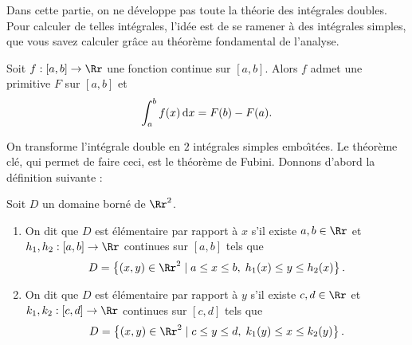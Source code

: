 \documentclass[class=report,crop=false]{standalone}
\begin{document}
\thispagestyle{empty}

\vskip4mm

\noindent Dans cette partie, on ne développe pas toute la théorie des intégrales doubles. Pour calculer de telles intégrales, l'idée est de se ramener à des intégrales simples, que vous savez calculer gr\^ace au théorème fondamental de l'analyse. 

\vskip6mm

\begin{theoreme}Soit $f:[a,b]\to \Rr$ une fonction continue sur $[a,b]$. Alors $f$ admet une primitive $F$ sur $[a,b]$ et
$$\int_{a}^{b}f(x)\,\mathrm{d} x=F(b)-F(a).$$
\end{theoreme}

\vskip4mm

\noindent On transforme l'intégrale double en $2$ intégrales simples embo\^{\i}tées. Le théorème clé, qui permet de faire ceci, est le théorème de Fubini. Donnons d'abord la définition suivante :

\vskip6mm

\begin{definition}Soit $D$ un domaine borné de $\Rr^2$.
\begin{enumerate}
\item On dit que $D$ est élémentaire par rapport à $x$ s'il existe $a,b\in \Rr$ et $h_1,h_2:[a,b]\to \Rr$ continues sur $[a,b]$ tels que
$$D=\left\{(x,y)\in \Rr^2\mid a\leq x\leq b,\; h_1(x)\leq y\leq h_2 (x)\right\}.$$
\item On dit que $D$ est élémentaire par rapport à $y$ s'il existe $c,d\in \Rr$ et $k_1,k_2:[c,d]\to \Rr$ continues sur $[c,d]$ tels que
$$D=\left\{(x,y)\in \Rr^2\mid c\leq y\leq d,\; k_1(y)\leq x\leq k_2 (y)\right\}.$$
\end{enumerate} 
\end{definition}
\end{document}
